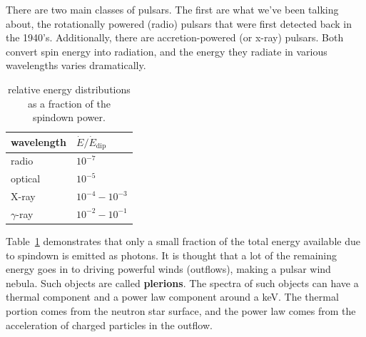 \documentclass[10pt]{article}
\numberwithin{equation}{section}
\newcommand{\n}{\noindent}
\begin{document}
	\n There are two main classes of pulsars. The first are what we've been talking about, the rotationally powered (radio) pulsars that were first detected back in the 1940's. Additionally, there are accretion-powered (or x-ray) pulsars. Both convert spin energy into radiation, and the energy they radiate in various wavelengths varies dramatically.
	\begin{table}
		\centering
		\begin{tabular}{l l}
			wavelength & $\dot{E}/\dot{E}_{\mathrm{dip}}$\\
			\hline\hline
			radio & $10^{-7}$\\
			optical & $10^{-5}$\\
			X-ray & $10^{-4}-10^{-3}$\\
			$\gamma$-ray & $10^{-2}-10^{-1}$
		\end{tabular}
		\label{tab:pulsar:1}
		\caption{relative energy distributions as a fraction of the spindown power.}
	\end{table}
	Table~\ref{tab:pulsar:1} demonstrates that only a small fraction of the total energy available due to spindown is emitted as photons. It is thought that a lot of the remaining energy goes in to driving powerful winds (outflows), making a pulsar wind nebula. Such objects are called \textbf{plerions}. The spectra of such objects can have a thermal component and a power law component around a keV. The thermal portion comes from the neutron star surface, and the power law comes from the acceleration of charged particles in the outflow.\\
	
\end{document}
